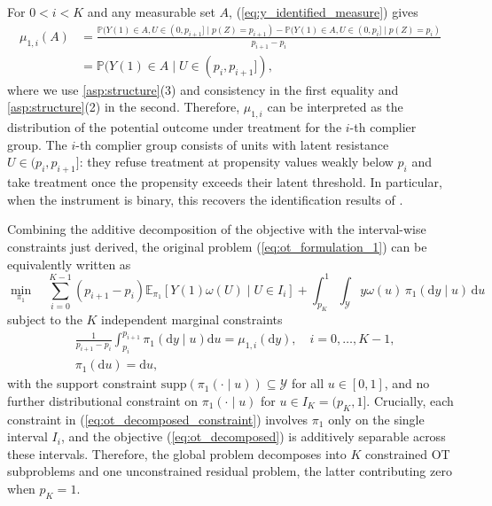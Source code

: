 For $0<i<K$ and any measurable set $A$, (\ref{eq:y_identified_measure}) gives
\begin{align*}
   \mu_{1,i}(A) &= \frac{\mathbb{P}(Y(1)\in A, U\in(0,p_{i+1}] \mid p(Z) = p_{i+1} ) - \mathbb{P}(Y(1)\in A, U\in(0,p_{i}]\mid p(Z) = p_{i} )}{p_{i+1} - p_i}\\
   & = \mathbb{P}(Y(1)\in A \mid U\in(p_i,p_{i+1}] ),
\end{align*}
where we use \cref{asp:structure}\textup{(3)} and consistency in the first equality and \cref{asp:structure}\textup{(2)} in the second. Therefore, $\mu_{1,i}$ can be interpreted as the distribution of the potential outcome under treatment for the $i$-th complier group. The $i$-th complier group consists of units with latent resistance $U \in (p_i,p_{i+1}]$: they refuse treatment at propensity values weakly below $p_i$ and take treatment once the propensity exceeds their latent threshold. In particular, when the instrument is binary, this recovers the identification results of \citet{imbens1997estimating}.

Combining the additive decomposition of the objective with the interval-wise constraints just derived, the original problem (\ref{eq:ot_formulation_1}) can be equivalently written as
\begin{equation}\label{eq:ot_decomposed}
    \min_{\pi_1} \quad
    \sum_{i=0}^{K-1}(p_{i+1}-p_i)\mathbb E_{\pi_1}[Y(1)\omega(U)\mid U\in I_i]
    +\int_{p_K}^{1}\int_{\mathcal Y}y\omega(u)\,\pi_1(\mathrm dy\mid u)\,\mathrm du
\end{equation}
subject to the $K$ independent marginal constraints
\begin{equation}\label{eq:ot_decomposed_constraint}
    \begin{split}
        &\frac{1}{p_{i+1} - p_i}\int_{p_i}^{p_{i+1}} \pi_{1}(\mathrm{d}y \mid u) \mathrm{d}u = \mu_{1,i}(\mathrm{d}y),\quad i = 0, \dots, K-1, \\
    &\pi_1(\mathrm{d}u)=\mathrm{d}u,
    \end{split}
\end{equation}
with the support constraint $\text{supp}(\pi_1(\cdot \mid u)) \subseteq \mathcal{Y}$ for all $u \in [0,1]$, and no further distributional constraint on $\pi_1(\cdot \mid u)$ for $u \in I_K = (p_K, 1]$. Crucially, each constraint in (\ref{eq:ot_decomposed_constraint}) involves $\pi_1$ only on the single interval $I_i$, and the objective (\ref{eq:ot_decomposed}) is additively separable across these intervals. Therefore, the global problem decomposes into $K$ constrained OT subproblems and one unconstrained residual problem, the latter contributing zero when $p_K=1$.



